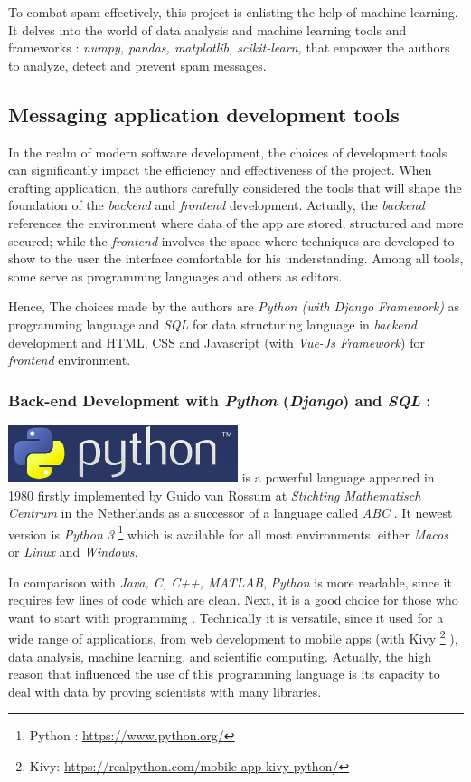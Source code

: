 \documentclass[12pt,a4paper]{report}
\begin{document}
	To combat spam effectively, this project is enlisting the help of machine learning. It delves into the world of data analysis and machine learning tools and frameworks : \textit{numpy, pandas, matplotlib, scikit-learn,} that empower the authors to analyze, detect and prevent spam messages.\\
	
	\subsection{Messaging application development tools}
	In the realm of modern software development, the choices of development tools can significantly impact the efficiency and effectiveness of the project. When crafting application, the authors carefully considered the tools that will shape the foundation of the \textit{backend} and \textit{frontend} development. Actually, the \textit{backend} references the environment where data of the app are stored, structured and more secured; while the \textit{frontend} involves the space where techniques are developed to show to the user the interface comfortable for his understanding. Among all tools, some serve as programming languages and others as editors. 
	
	Hence, The choices made by the authors are \textit{Python (with Django \textit{Framework})} as programming language and \textit{SQL} for data structuring language in \textit{backend} development and HTML, CSS and Javascript (with \textit{Vue-Js Framework}) for \textit{frontend} environment. \\
	
	\subsubsection{Back-end Development with \textit{Python} (\textit{Django}) and \textit{SQL} :}  
	\includegraphics[width=0.2\linewidth]{pythonImage.png}
	 is a powerful language appeared in 1980 firstly implemented by Guido van Rossum at \textit{Stichting Mathematisch Centrum} in the Netherlands as a successor of a language called  \textit{ABC} \cite{tulchak2016history}. It newest version is \textit{Python 3} \footnote{Python : \url{https://www.python.org/}}  which is available for all most environments, either \textit{Macos} or \textit{Linux} and \textit{Windows}.
	 
	 In comparison with \textit{Java, C, C++, MATLAB}, \textit{Python} is more readable, since it requires few lines of code which are clean. Next, it is a good choice for those who want to start with programming \cite{bogdanchikov2013python}. Technically it is versatile, since it used for a wide range of applications, from web development to mobile apps (with Kivy \footnote{Kivy: \url{ https://realpython.com/mobile-app-kivy-python/}} ), data analysis, machine learning, and scientific computing. Actually, the high reason that influenced the use of this programming language is its capacity to deal with data by proving scientists with many libraries. \\
	 
\end{document}
